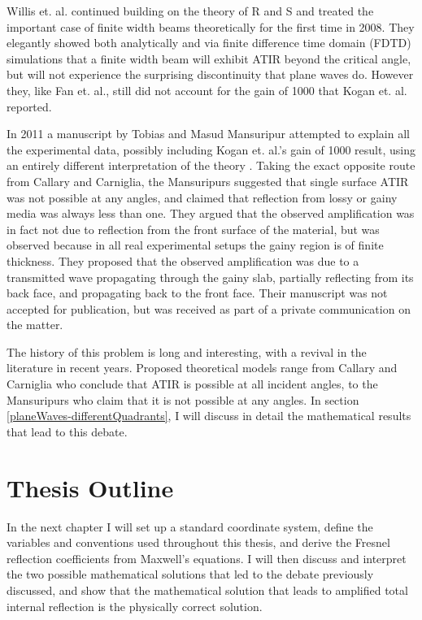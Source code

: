 \documentclass[12pt]{uthesis-v12}
\begin{document}
Willis et. al. continued building on the theory of R and S and treated the important case of finite width beams theoretically for the first time \cite{Willis} in 2008. They elegantly showed both analytically and via finite difference time domain (FDTD) simulations that a finite width beam will exhibit ATIR beyond the critical angle, but will not experience the surprising discontinuity that plane waves do. However they, like Fan et. al., still did not account for the gain of 1000 that Kogan et. al. reported.

In 2011 a manuscript by Tobias and Masud Mansuripur attempted to explain all the experimental data, possibly including Kogan et. al.'s gain of 1000 result, using an entirely different interpretation of the theory \cite{Mansuripur}. Taking the exact opposite route from Callary and Carniglia, the Mansuripurs suggested that single surface ATIR was not possible at any angles, and claimed that reflection from lossy or gainy media was always less than one.  They argued that the observed amplification was in fact not due to reflection from the front surface of the material, but was observed because in all real experimental setups the gainy region is of finite thickness. They proposed that the observed amplification was due to a transmitted wave propagating through the gainy slab, partially reflecting from its back face, and propagating back to the front face.  Their manuscript was not accepted for publication, but was received as part of a private communication on the matter.

The history of this problem is long and interesting, with a revival in the literature in recent years. Proposed theoretical models range from Callary and Carniglia who conclude that ATIR is possible at all incident angles, to the Mansuripurs who claim that it is not possible at any angles. In section \ref{planeWaves-differentQuadrants}, I will discuss in detail the mathematical results that lead to this debate.

\section{Thesis Outline}
In the next chapter I will set up a standard coordinate system, define the variables and conventions used throughout this thesis, and derive the Fresnel reflection coefficients from Maxwell's equations.  I will then discuss and interpret the two possible mathematical solutions that led to the debate previously discussed, and show that the mathematical solution that leads to amplified total internal reflection is the physically correct solution.
\end{document}
